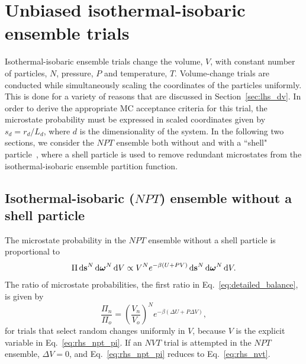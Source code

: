 \section{\label{sec:rhs_npt}Unbiased isothermal-isobaric ensemble trials}

Isothermal-isobaric ensemble trials change the volume, $V$, with constant number of particles, $N$, pressure, $P$ and temperature, $T$.
Volume-change trials are conducted while simultaneously scaling the coordinates of the particles uniformly.
This is done for a variety of reasons that are discussed in Section~\ref{sec:lhs_dv}.
In order to derive the appropriate MC acceptance criteria for this trial, the microstate probability must be expressed in scaled coordinates given by $s_d = r_d/L_d$, where $d$ is the dimensionality of the system.
In the following two sections, we consider the $NPT$ ensemble both without and with a ``shell" particle~\cite{koper_length_1996, corti_deriving_1998, hatch_theory_2024}, where a shell particle is used to remove redundant microstates from the isothermal-isobaric ensemble partition function.

\subsection{\label{sec:rhs_npt_shell}Isothermal-isobaric ($NPT$) ensemble without a shell particle}

The microstate probability in the $NPT$ ensemble without a shell particle is proportional to \cite{wood_monte_1968, allen_computer_1989, frenkel_understanding_2002}
\begin{equation}
\Pi \mathop{}\!\mathrm{d}\mathbf{s}^{N}\mathop{}\!\mathrm{d}\boldsymbol{\omega}^{N}\mathop{}\!\mathrm{d} V \propto V^{N} e^{-\beta(U+P V)} \mathop{}\!\mathrm{d}\mathbf{s}^{N} \mathop{}\!\mathrm{d}\boldsymbol{\omega}^{N}\mathop{}\!\mathrm{d} V.
\label{eq:rhs_npt_pi}
\end{equation}
The ratio of microstate probabilities, the first ratio in Eq.~\ref{eq:detailed_balance}, is given by
\begin{equation}
\frac{\Pi_n}{\Pi_o} = \left(\frac{V_n}{V_o}\right)^{N}e^{-\beta(\Delta U + P\Delta V)},
\label{eq:rhs_npt_delta_v}
\end{equation}
for trials that select random changes uniformly in $V$, because $V$ is the explicit variable in Eq.~\ref{eq:rhs_npt_pi}.
If an $NVT$ trial is attempted in the $NPT$ ensemble, $\Delta V=0$, and Eq.~\ref{eq:rhs_npt_pi} reduces to Eq.~\ref{eq:rhs_nvt}.


